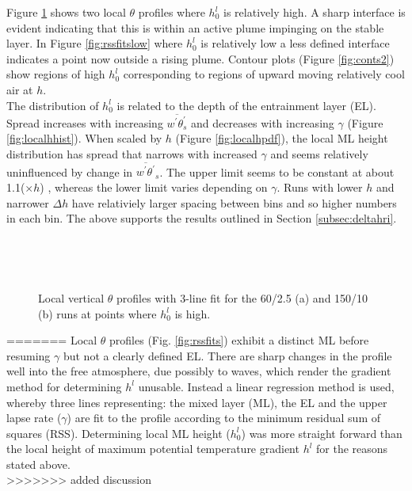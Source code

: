 Figure \ref{fig:rssfitshigh} shows two local $\theta$ profiles where $h_{0}^{l}$ is relatively high.  
A sharp interface is evident indicating that this is within an active plume impinging on the stable layer.
In Figure \ref{fig:rssfitslow} where $h_{0}^{l}$ is relatively low a less defined interface indicates 
a point now outside a rising plume.  Contour plots (Figure \ref{fig:conts2}) show regions of high 
$h_{0}^{l}$ corresponding to regions of upward moving relatively cool air at $h$.\\

The distribution of $h_{0}^{l}$ is related to the depth of the entrainment layer (\acs{EL}).
Spread increases with increasing $\overline{w^{'}\theta^{'}_{s}}$ and decreases with increasing $\gamma$
(Figure \ref{fig:localhhist}).  When scaled by $h$  (Figure \ref{fig:localhpdf}), the local \acs{ML} height distribution 
has spread that narrows with increased $\gamma$ and seems relatively uninfluenced by change in $\overline{w^{'}\theta^{'}}_{s}$.  
The upper limit seems to be constant at about 1.1($\times h$) , whereas the lower limit varies 
depending on $\gamma$.   Runs with lower $h$ and narrower $\Delta h$ have relativiely 
larger spacing between bins and so higher numbers in each bin.  The above supports the results outlined in
Section \ref{subsec:deltahri}.\\


\begin{figure}[htbp]
\begin{minipage}[b]{0.5\linewidth}
        \\
        \end{minipage}             
\quad
\begin{minipage}[b]{0.5\linewidth}
        \\
       
       \end{minipage}
        \caption{Local vertical $\theta$ profiles with 3-line fit for the 60/2.5 (a) and 150/10 (b) runs at 
points where $h^{l}_{0}$ is high.}
        \label{fig:rssfitshigh}
\end{figure}
=======
Local $\theta$ profiles (Fig. \ref{fig:rssfits}) exhibit a distinct \acs{ML} before resuming $\gamma$ but not 
a clearly defined \acs{EL}. There are sharp changes in the profile well into the free atmosphere, due possibly to 
waves, which render the gradient method for determining $h^{l}$ unusable.  Instead a linear regression method is used, 
whereby three lines representing: the mixed layer (ML), the EL and the upper lapse rate ($\gamma$) are fit to the 
profile according to the minimum residual sum of squares (RSS).  Determining local \acs{ML} height ($h_{0}^{l}$) was 
more straight forward than the local height of maximum potential temperature gradient $h^{l}$ for the reasons stated 
above.\\  
>>>>>>> added discussion


